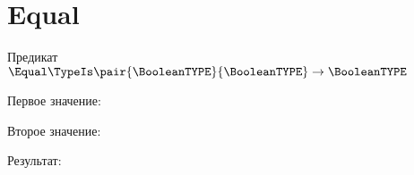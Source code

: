 \section{Equal}
\begin{frame}{Предикат $\Equal\TypeIs\pair{\BooleanTYPE}{\BooleanTYPE}\to\BooleanTYPE$}

	Первое значение:


	Второе значение:


	Результат:

\end{frame}